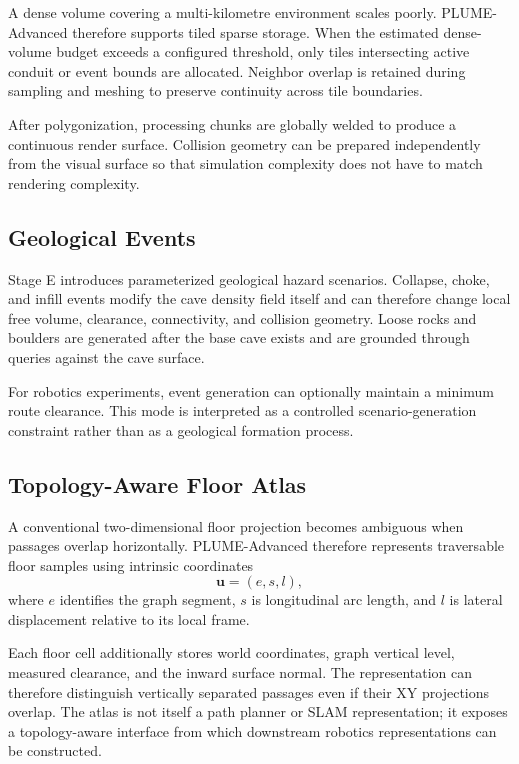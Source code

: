 \documentclass[conference]{IEEEtran}
\begin{document}
A dense volume covering a multi-kilometre environment scales poorly. PLUME-Advanced therefore supports tiled sparse storage. When the estimated dense-volume budget exceeds a configured threshold, only tiles intersecting active conduit or event bounds are allocated. Neighbor overlap is retained during sampling and meshing to preserve continuity across tile boundaries.

After polygonization, processing chunks are globally welded to produce a continuous render surface. Collision geometry can be prepared independently from the visual surface so that simulation complexity does not have to match rendering complexity.

\subsection{Geological Events}

Stage E introduces parameterized geological hazard scenarios. Collapse, choke, and infill events modify the cave density field itself and can therefore change local free volume, clearance, connectivity, and collision geometry. Loose rocks and boulders are generated after the base cave exists and are grounded through queries against the cave surface.

For robotics experiments, event generation can optionally maintain a minimum route clearance. This mode is interpreted as a controlled scenario-generation constraint rather than as a geological formation process.

\subsection{Topology-Aware Floor Atlas}

A conventional two-dimensional floor projection becomes ambiguous when passages overlap horizontally. PLUME-Advanced therefore represents traversable floor samples using intrinsic coordinates
\begin{equation}
\mathbf{u}=(e,s,l),
\label{eq:intrinsic}
\end{equation}
where $e$ identifies the graph segment, $s$ is longitudinal arc length, and $l$ is lateral displacement relative to its local frame.

Each floor cell additionally stores world coordinates, graph vertical level, measured clearance, and the inward surface normal. The representation can therefore distinguish vertically separated passages even if their XY projections overlap. The atlas is not itself a path planner or SLAM representation; it exposes a topology-aware interface from which downstream robotics representations can be constructed.
\end{document}

